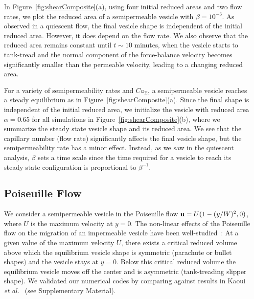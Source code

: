 \documentclass[9pt,twocolumn,twoside,lineno]{pnas-new}
\begin{document}
In Figure~\ref{fig:shearComposite}(a), using four initial reduced areas
and two flow rates, we plot the reduced area of a semipermeable vesicle
with $\beta = 10^{-3}$. As observed in a quiescent flow, the final
vesicle shape is independent of the initial reduced area. However, it
does depend on the flow rate. We also observe that the reduced area
remains constant until $t\sim 10$ minutes, when the vesicle starts to
tank-tread and the normal component of the force-balance velocity
becomes significantly smaller than the permeable velocity, leading to a
changing reduced area.

For a variety of semipermeability rates and $Ca_\mathrm{E}$, a
semipermeable vesicle reaches a steady equilibrium as in
Figure~\ref{fig:shearComposite}(a). Since the final shape is independent
of the initial reduced area, we initialize the vesicle with reduced area
$\alpha = 0.65$ for all simulations in
Figure~\ref{fig:shearComposite}(b), where we summarize the steady state
vesicle shape and its reduced area. We see that the capillary number
(flow rate) significantly affects the final vesicle shape, but the
semipermeability rate has a minor effect. Instead, as we saw in the
quiescent analysis, $\beta$ sets a time scale since the time required
for a vesicle to reach its steady state configuration is proportional to
$\beta^{-1}$.

\subsection*{Poiseuille Flow}

We consider a semipermeable vesicle in the Poiseuille flow $\mathbf{u} =
U(1-(y/W)^2,0)$, where $U$ is the maximum velocity at $y=0$. The
non-linear effects of the Poiseuille flow on the migration of an
impermeable vesicle have been well-studied~\cite{kao-bir-mis2009}: At a
given value of the maximum velocity $U$, there exists a critical reduced
volume above which the equilibrium vesicle shape is symmetric (parachute
or bullet shapes) and the vesicle stays at $y=0$. Below this critical
reduced volume the equilibrium vesicle moves off the center and is
asymmetric (tank-treading slipper shape). We validated our numerical
codes by comparing against results in Kaoui {\em et
al.}~\cite{kao-bir-mis2009} (see Supplementary Material).
\end{document}
